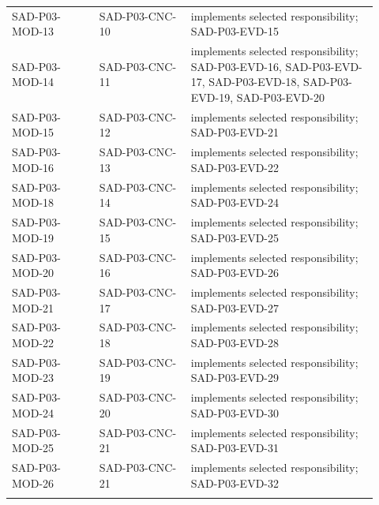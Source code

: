 \documentclass[10pt,letterpaper]{article}
\begin{document}
\begin{longtable}{@{}>{\raggedright\arraybackslash}p{0.22\linewidth}>{\raggedright\arraybackslash}p{0.23\linewidth}>{\raggedright\arraybackslash}p{0.47\linewidth}@{}}
SAD-P03-MOD-13 & SAD-P03-CNC-10 & implements selected responsibility; SAD-P03-EVD-15\\\addlinespace
SAD-P03-MOD-14 & SAD-P03-CNC-11 & implements selected responsibility; SAD-P03-EVD-16, SAD-P03-EVD-17, SAD-P03-EVD-18, SAD-P03-EVD-19, SAD-P03-EVD-20\\\addlinespace
SAD-P03-MOD-15 & SAD-P03-CNC-12 & implements selected responsibility; SAD-P03-EVD-21\\\addlinespace
SAD-P03-MOD-16 & SAD-P03-CNC-13 & implements selected responsibility; SAD-P03-EVD-22\\\addlinespace
SAD-P03-MOD-18 & SAD-P03-CNC-14 & implements selected responsibility; SAD-P03-EVD-24\\\addlinespace
SAD-P03-MOD-19 & SAD-P03-CNC-15 & implements selected responsibility; SAD-P03-EVD-25\\\addlinespace
SAD-P03-MOD-20 & SAD-P03-CNC-16 & implements selected responsibility; SAD-P03-EVD-26\\\addlinespace
SAD-P03-MOD-21 & SAD-P03-CNC-17 & implements selected responsibility; SAD-P03-EVD-27\\\addlinespace
SAD-P03-MOD-22 & SAD-P03-CNC-18 & implements selected responsibility; SAD-P03-EVD-28\\\addlinespace
SAD-P03-MOD-23 & SAD-P03-CNC-19 & implements selected responsibility; SAD-P03-EVD-29\\\addlinespace
SAD-P03-MOD-24 & SAD-P03-CNC-20 & implements selected responsibility; SAD-P03-EVD-30\\\addlinespace
SAD-P03-MOD-25 & SAD-P03-CNC-21 & implements selected responsibility; SAD-P03-EVD-31\\\addlinespace
SAD-P03-MOD-26 & SAD-P03-CNC-21 & implements selected responsibility; SAD-P03-EVD-32\\\addlinespace
\bottomrule\end{longtable}
\end{document}
